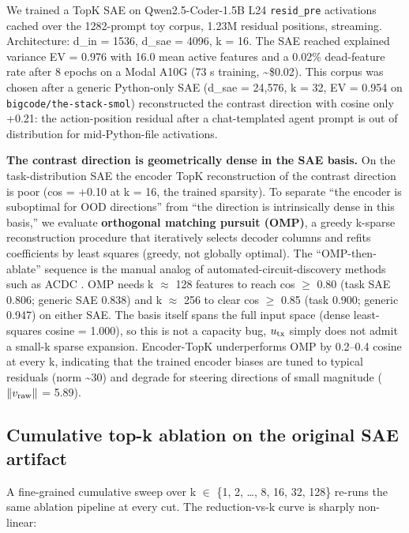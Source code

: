 \documentclass[
  11pt,
  a4paper]{article}
\begin{document}
We trained a TopK SAE
\citep{gao2024scaling, bricken2023monosemanticity, templeton2024scaling}
on Qwen2.5-Coder-1.5B L24 \texttt{resid\_pre} activations cached over
the 1282-prompt toy corpus, 1.23M residual positions, streaming.
Architecture: d\_in = 1536, d\_sae = 4096, k = 16. The SAE reached
explained variance EV = 0.976 with 16.0 mean active features and a
0.02\% dead-feature rate after 8 epochs on a Modal A10G (73 s training,
\textasciitilde\$0.02). This corpus was chosen after a generic
Python-only SAE (d\_sae = 24,576, k = 32, EV = 0.954 on
\texttt{bigcode/the-stack-smol}) reconstructed the contrast direction
with cosine only +0.21: the action-position residual after a
chat-templated agent prompt is out of distribution for mid-Python-file
activations.

\textbf{The contrast direction is geometrically dense in the SAE basis.}
On the task-distribution SAE the encoder TopK reconstruction of the
contrast direction is poor (cos = +0.10 at k = 16, the trained
sparsity). To separate ``the encoder is suboptimal for OOD directions''
from ``the direction is intrinsically dense in this basis,'' we evaluate
\textbf{orthogonal matching pursuit (OMP)}, a greedy k-sparse
reconstruction procedure that iteratively selects decoder columns and
refits coefficients by least squares (greedy, not globally optimal). The
``OMP-then-ablate'' sequence is the manual analog of
automated-circuit-discovery methods such as ACDC \citep{conmy2023acdc}.
OMP needs k \ensuremath{\approx} 128 features to reach cos \ensuremath{\geq} 0.80 (task SAE 0.806; generic
SAE 0.838) and k \ensuremath{\approx} 256 to clear cos \ensuremath{\geq} 0.85 (task 0.900; generic 0.947)
on either SAE. The basis itself spans the full input space (dense
least-squares cosine = 1.000), so this is not a capacity bug,
\(u_{\rm tx}\) simply does not admit a small-k sparse expansion.
Encoder-TopK underperforms OMP by 0.2--0.4 cosine at every k, indicating
that the trained encoder biases are tuned to typical residuals (norm
\textasciitilde30) and degrade for steering directions of small
magnitude (\(\|v_{\rm raw}\|\) = 5.89).

\subsection{Cumulative top-k ablation on the original SAE
artifact}\label{cumulative-top-k-ablation-on-the-original-sae-artifact}

A fine-grained cumulative sweep over k \ensuremath{\in} \{1, 2, \ldots, 8, 16, 32,
128\} re-runs the same ablation pipeline at every cut. The
reduction-vs-k curve is sharply non-linear:
\end{document}
